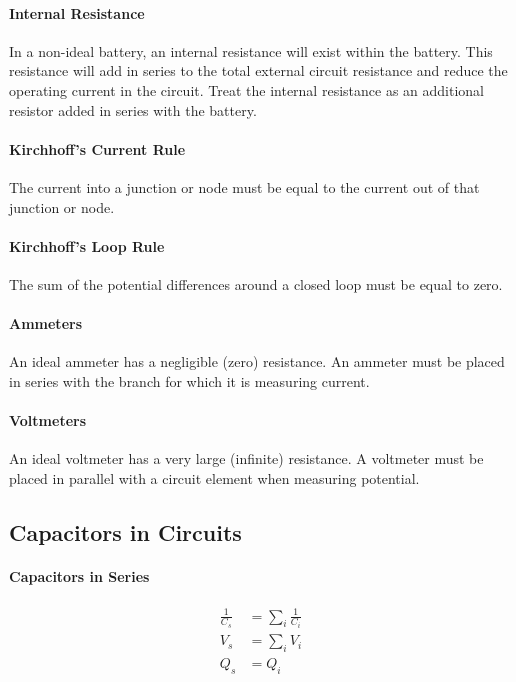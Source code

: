 \documentclass{article}
\begin{document}
            \paragraph{Internal Resistance}
            In a non-ideal battery, an internal resistance will exist within the battery. This resistance will add in series to the total external circuit resistance and reduce the operating current in the circuit. Treat the internal resistance as an additional resistor added in series with the battery.

            \paragraph{Kirchhoff's Current Rule}
            The current into a junction or node must be equal to the current out of that junction or node.

            \paragraph{Kirchhoff's Loop Rule}
            The sum of the potential differences around a closed loop must be equal to zero.

            \paragraph{Ammeters}
            An ideal ammeter has a negligible (zero) resistance. An ammeter must be placed in series with the branch for which it is measuring current.

            \paragraph{Voltmeters}
            An ideal voltmeter has a very large (infinite) resistance. A voltmeter must be placed in parallel with a circuit element when measuring potential.

        \subsection{Capacitors in Circuits}
            \paragraph{Capacitors in Series}
            \begin{align}
                \frac{1}{C_s} &= \sum_i \frac{1}{C_i} \\
                V_s &= \sum_i V_i \\
                Q_s &= Q_i
            \end{align}
\end{document}
